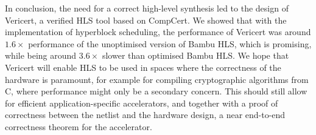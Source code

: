 In conclusion, the need for a correct high-level synthesis led to the design of
Vericert, a verified \gls{HLS} tool based on CompCert.  We showed that with the
implementation of hyperblock scheduling, the performance of Vericert was around
$1.6\times$ performance of the unoptimised version of Bambu HLS, which is
promising, while being around $3.6\times$ slower than optimised Bambu HLS.  We
hope that Vericert will enable \gls{HLS} to be used in spaces where the
correctness of the hardware is paramount, for example for compiling
cryptographic algorithms from C, where performance might only be a secondary
concern.  This should still allow for efficient application-specific
accelerators, and together with a proof of correctness between the netlist and
the hardware design, a near end-to-end correctness theorem for the accelerator.


